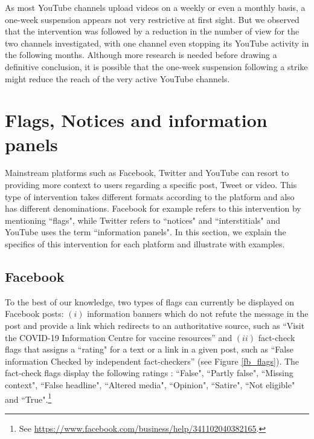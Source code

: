 \documentclass{article}
\begin{document}
\smallskip

As most YouTube channels upload videos on a weekly or even a monthly basis, a one-week suspension appears not very restrictive at first sight. 
But we observed that the intervention was followed by a reduction in the number of view for the two channels investigated, with one channel even stopping its YouTube activity in the following months. 
Although more research is needed before drawing a definitive conclusion, it is possible that the one-week suspension following a strike might reduce the reach of the very active YouTube channels.


\section{Flags, Notices and information panels} \label{flags}

Mainstream platforms such as Facebook, Twitter and YouTube can resort to providing more context to users regarding a specific post, Tweet or video. This type of intervention takes different formats according to the platform and also has different denominations. Facebook for example refers to this intervention by mentioning ``flags", while Twitter  refers to ``notices" and ``interstitials" and YouTube uses the term ``information panels". In this section, we explain the specifics of this intervention for each platform and illustrate with examples. 

\subsection{Facebook}

To the best of our knowledge, two types of flags can currently be displayed on Facebook posts: 
$(i)$ information banners which do not refute the message in the post and provide a link which redirects to an authoritative source, such as ``Visit the COVID-19 Information Centre for vaccine resources'' and $(ii)$ fact-check flags that assigns a ``rating" for a text or a link in a given post, such as ``False information Checked by independent fact-checkers'' (see Figure \ref{fb_flags}). The fact-check flags display the following ratings : ``False", ``Partly false", ``Missing context", ``False headline", ``Altered media", ``Opinion", ``Satire", ``Not eligible" and ``True".\footnote{See \href{https://www.facebook.com/business/help/341102040382165}{https://www.facebook.com/business/help/341102040382165}.}
\end{document}
